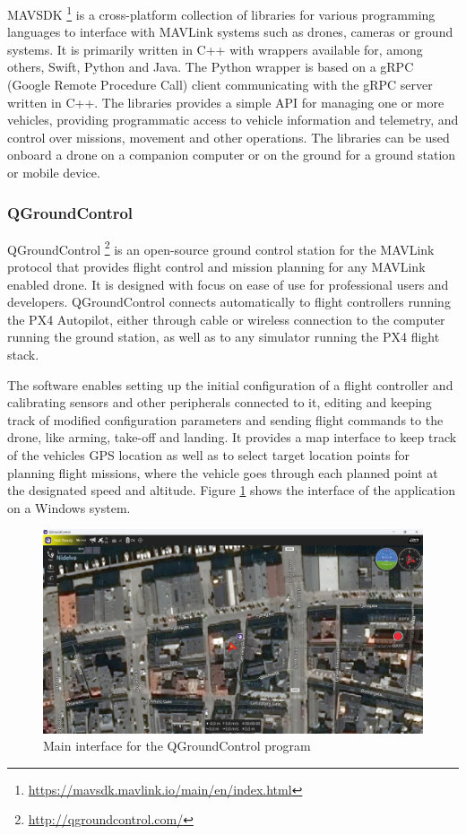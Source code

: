 MAVSDK \footnote{\url{https://mavsdk.mavlink.io/main/en/index.html}} is a cross-platform collection of libraries for various programming languages
to interface with MAVLink systems such as drones, cameras or ground systems.
It is primarily written in C++ with wrappers available for,
among others, Swift, Python and Java.
The Python wrapper is based on a gRPC (Google Remote Procedure Call) client communicating with the gRPC server written in C++.
The libraries provides a simple API for managing one or more vehicles, 
providing programmatic access to vehicle information and telemetry, 
and control over missions, movement and other operations.
The libraries can be used onboard a drone on a companion computer
or on the ground for a ground station or mobile device.


\subsubsection{QGroundControl}
\label{subsec:qgc}
QGroundControl \footnote{\url{http://qgroundcontrol.com/}} is an open-source ground control station for the MAVLink protocol that provides flight control and mission planning for any MAVLink enabled drone.
It is designed with focus on ease of use for professional users and developers.
QGroundControl connects automatically to flight controllers running the PX4 Autopilot, either through cable or wireless connection to the computer running the ground station, as well as to any simulator running the PX4 flight stack.

The software enables setting up the initial configuration of a flight controller and calibrating sensors and other peripherals connected to it, editing and keeping track of modified configuration parameters and sending flight commands to the drone, like arming, take-off and landing.
It provides a map interface to keep track of the vehicles GPS location as well as to select target location points for planning flight missions, where the vehicle goes through each planned point at the designated speed and altitude.
Figure \ref{fig:qgc-map} shows the interface of the application on a Windows system.

\begin{figure}
  \centering
  \includegraphics[width=\textwidth,keepaspectratio]{img/qgc-map.png}
  \caption{Main interface for the QGroundControl program}
  \label{fig:qgc-map}
\end{figure}

